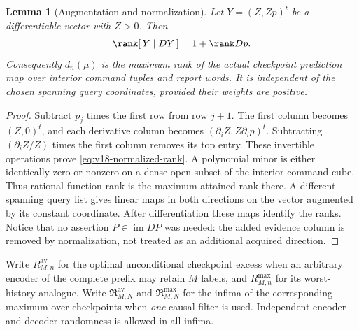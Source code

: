 \documentclass[11pt]{amsart}
\newtheorem{lemma}[theorem]{Lemma}
\theoremstyle{definition}\newtheorem{definition}[theorem]{Definition}
\theoremstyle{remark}\newtheorem{remark}[theorem]{Remark}
\begin{document}
\begin{lemma}[Augmentation and normalization]\label{lem:v18-normalized-rank}
Let $Y=(Z,Zp)^t$ be a differentiable vector with $Z>0$. Then
\begin{equation}\label{eq:v18-normalized-rank}
 \rank[\,Y\mid DY\,]=1+\rank Dp.
\end{equation}
Consequently $d_n(\mu)$ is the maximum rank of the actual checkpoint
prediction map over interior command tuples and report words. It is
independent of the chosen spanning query coordinates, provided their
weights are positive.
\end{lemma}
\begin{proof}
Subtract $p_j$ times the first row from row $j+1$. The first column
becomes $(Z,0)^t$, and each derivative column becomes
$(\partial_iZ,Z\partial_ip)^t$. Subtracting
$(\partial_iZ/Z)$ times the first column removes its top entry.
These invertible operations prove \eqref{eq:v18-normalized-rank}.
A polynomial minor is either identically zero or nonzero on a dense
open subset of the interior command cube. Thus rational-function rank
is the maximum attained rank there. A different spanning query list
gives linear maps in both directions on the vector augmented by its
constant coordinate. After differentiation these maps identify the
ranks. Notice that no assertion $P\in\operatorname{im}DP$ was needed:
the added evidence column is removed by normalization, not treated as
an additional acquired direction.
\end{proof}

Write $R^{\mathrm{av}}_{M,n}$ for the optimal unconditional checkpoint
excess when an arbitrary encoder of the complete prefix may retain
$M$ labels, and $R^{\mathrm{max}}_{M,n}$ for its worst-history analogue.
Write $\mathfrak R^{\mathrm{av}}_{M,N}$ and
$\mathfrak R^{\mathrm{max}}_{M,N}$ for the infima of the corresponding
maximum over checkpoints when \emph{one} causal filter is used.
Independent encoder and decoder randomness is allowed in all infima.
\end{document}
